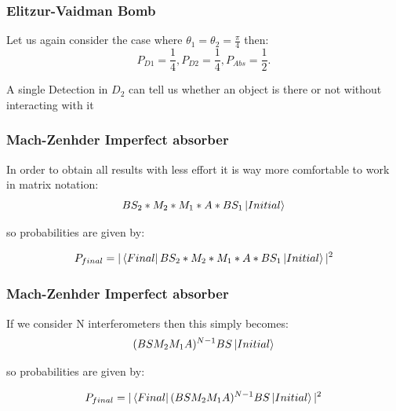 \documentclass[]{beamer}
\begin{document}
\begin{frame}
\frametitle{Elitzur-Vaidman Bomb}
Let us again consider the case where $\theta_{1}=\theta_{2}=\frac{\pi}{4}$ then:
\begin{equation}
P_{D1}=\frac{1}{4},P_{D2}=\frac{1}{4},P_{Abs}=\frac{1}{2}.
\end{equation}

A single Detection in $D_{2}$ can tell us whether an object is there or not without interacting with it 
\end{frame}

\begin{frame}
\frametitle{Mach-Zenhder Imperfect absorber}
In order to obtain all results with less effort it is way more comfortable to work in matrix notation: 
\begin{equation}
BS_{2}*M_{2}*M_{1}*A*BS_{1}\ket{Initial}
\end{equation}

so probabilities are given by:

\begin{equation}
P_{final}=|\bra{Final}BS_{2}*M_{2}*M_{1}*A*BS_{1}\ket{Initial}|^{2}
\end{equation}
\end{frame}


\begin{frame}
\frametitle{Mach-Zenhder Imperfect absorber}
If we consider N interferometers then this simply becomes: 
\begin{equation}
(BS M_{2} M_{1} A)^{N-1}BS\ket{Initial}
\end{equation}

so probabilities are given by:

\begin{equation}
P_{final}=|\bra{Final}(BS M_{2} M_{1} A)^{N-1}BS \ket{Initial}|^{2}
\end{equation}
\end{frame}
\end{document}
